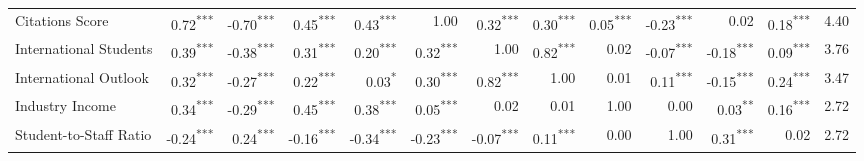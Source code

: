 \documentclass[conference]{IEEEtran}
\begin{document}
\begin{table*}[h!]
\begin{tabular}{|l|r|r|r|r|r|r|r|r|r|r|r|r|}
		Citations Score & \cellcolor{gray!35}0.72\textsuperscript{***} & \cellcolor{gray!35}-0.70\textsuperscript{***} & \cellcolor{gray!22}0.45\textsuperscript{***} & \cellcolor{gray!21}0.43\textsuperscript{***} & \cellcolor{gray!50}1.00 & \cellcolor{gray!16}0.32\textsuperscript{***} & \cellcolor{gray!15}0.30\textsuperscript{***} & \cellcolor{gray!03}0.05\textsuperscript{***} & \cellcolor{gray!11}-0.23\textsuperscript{***} & \cellcolor{gray!01}0.02 & \cellcolor{gray!09}0.18\textsuperscript{***} & 4.40 \\
		
		International Students & \cellcolor{gray!19}0.39\textsuperscript{***} & \cellcolor{gray!19}-0.38\textsuperscript{***} & \cellcolor{gray!16}0.31\textsuperscript{***} & \cellcolor{gray!10}0.20\textsuperscript{***} & \cellcolor{gray!16}0.32\textsuperscript{***} & \cellcolor{gray!50}1.00 & \cellcolor{gray!41}0.82\textsuperscript{***} & \cellcolor{gray!01}0.02 & \cellcolor{gray!04}-0.07\textsuperscript{***} & \cellcolor{gray!09}-0.18\textsuperscript{***} & \cellcolor{gray!05}0.09\textsuperscript{***} & 3.76 \\
		
		International Outlook & \cellcolor{gray!16}0.32\textsuperscript{***} & \cellcolor{gray!13}-0.27\textsuperscript{***} & \cellcolor{gray!11}0.22\textsuperscript{***} & \cellcolor{gray!02}0.03\textsuperscript{*} & \cellcolor{gray!15}0.30\textsuperscript{***} & \cellcolor{gray!41}0.82\textsuperscript{***} & \cellcolor{gray!50}1.00 & \cellcolor{gray!01}0.01 & \cellcolor{gray!06}0.11\textsuperscript{***} & \cellcolor{gray!08}-0.15\textsuperscript{***} & \cellcolor{gray!12}0.24\textsuperscript{***} & 3.47 \\
		
		Industry Income & \cellcolor{gray!17}0.34\textsuperscript{***} & \cellcolor{gray!14}-0.29\textsuperscript{***} & \cellcolor{gray!22}0.45\textsuperscript{***} & \cellcolor{gray!19}0.38\textsuperscript{***} & \cellcolor{gray!03}0.05\textsuperscript{***} & \cellcolor{gray!01}0.02 & \cellcolor{gray!01}0.01 & \cellcolor{gray!50}1.00 & \cellcolor{gray!00}0.00 & \cellcolor{gray!02}0.03\textsuperscript{**} & \cellcolor{gray!08}0.16\textsuperscript{***} & 2.72 \\
		
		Student-to-Staff Ratio & \cellcolor{gray!12}-0.24\textsuperscript{***} & \cellcolor{gray!12}0.24\textsuperscript{***} & \cellcolor{gray!08}-0.16\textsuperscript{***} & \cellcolor{gray!17}-0.34\textsuperscript{***} & \cellcolor{gray!11}-0.23\textsuperscript{***} & \cellcolor{gray!04}-0.07\textsuperscript{***} & \cellcolor{gray!06}0.11\textsuperscript{***} & \cellcolor{gray!00}0.00 & \cellcolor{gray!50}1.00 & \cellcolor{gray!16}0.31\textsuperscript{***} & \cellcolor{gray!01}0.02 & 2.72 \\
		

\end{tabular}
\end{table*}
\end{document}
